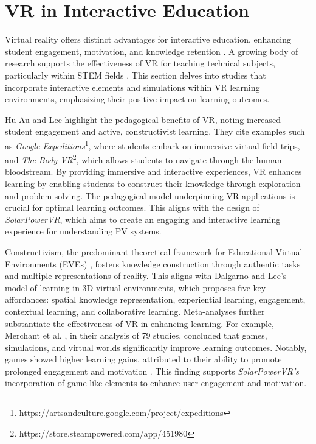 \documentclass[draft, final]{vutinfth} %
\begin{document}
\section{VR in Interactive Education}

Virtual reality offers distinct advantages for interactive education, enhancing student engagement, motivation, and knowledge retention \cite{Dalgarno2010Learning, HuAu2018VrExperience, Lege2020VrProgress}. A growing body of research supports the effectiveness of VR for teaching technical subjects, particularly within STEM fields \cite{Merchant2014VrEffectiveness, Mikropoulos2011VrEducational}. This section delves into studies that incorporate interactive elements and simulations within VR learning environments, emphasizing their positive impact on learning outcomes.

Hu-Au and Lee \cite{HuAu2018VrExperience} highlight the pedagogical benefits of VR, noting increased student engagement and active, constructivist learning. They cite examples such as \textit{Google Expeditions}\footnote{https://artsandculture.google.com/project/expeditions}, where students embark on immersive virtual field trips, and \textit{The Body VR}\footnote{https://store.steampowered.com/app/451980}, which allows students to navigate through the human bloodstream. By providing immersive and interactive experiences, VR enhances learning by enabling students to construct their knowledge through exploration and problem-solving. The pedagogical model underpinning VR applications is crucial for optimal learning outcomes. This aligns with the design of \textit{SolarPowerVR}, which aims to create an engaging and interactive learning experience for understanding PV systems.

Constructivism, the predominant theoretical framework for Educational Virtual Environments (EVEs) \cite{Mikropoulos2011VrEducational}, fosters knowledge construction through authentic tasks and multiple representations of reality. This aligns with Dalgarno and Lee's \cite{Dalgarno2010Learning} model of learning in 3D virtual environments, which proposes five key affordances: spatial knowledge representation, experiential learning, engagement, contextual learning, and collaborative learning. Meta-analyses further substantiate the effectiveness of VR in enhancing learning. For example, Merchant et al. \cite{Merchant2014VrEffectiveness}, in their analysis of 79 studies, concluded that games, simulations, and virtual worlds significantly improve learning outcomes. Notably, games showed higher learning gains, attributed to their ability to promote prolonged engagement and motivation \cite{Gee2012Situated}. This finding supports \textit{SolarPowerVR's} incorporation of game-like elements to enhance user engagement and motivation.
\end{document}
